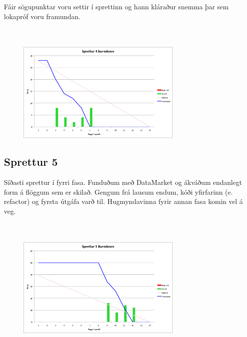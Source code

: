 \documentclass{article}
\begin{document}
Fáir sögupunktar voru settir í sprettinn og hann kláraður snemma þar sem lokapróf voru framundan.
\hfil \\
\hfil \\
\hfil \\
\begin{figure}[H]
 \centering
 \includegraphics[width=0.72\textwidth]{Sprettur4_Burndown.png}
 \caption{}
\label{fig:sp4}
\end{figure}
\newpage
\subsection{Sprettur 5}
Síðasti sprettur í fyrri fasa. Funduðum með DataMarket og ákváðum endanlegt form á
flöggum sem er skilað. Gengum frá lausum endum, kóði yfirfarinn 
(e. refactor) og fyrsta útgáfa varð til. Hugmyndavinna fyrir annan fasa komin vel á veg.
\hfil \\
\hfil \\
\hfil \\
\begin{figure}[H]
 \centering
 \includegraphics[width=0.72\textwidth]{Sprettur5_Burndown.png}
 \caption{}
\label{fig:sp5}
\end{figure}
\newpage
\end{document}
